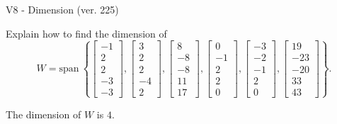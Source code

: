 \begin{exercise}
  \begin{exerciseTitle}V8 - Dimension (ver. 225)\end{exerciseTitle}
  \begin{exerciseStatement}
    Explain how to find the dimension of 
\[W=\mathrm{span}\ \left\{\left[\begin{array}{r}
-1 \\
2 \\
2 \\
-3 \\
-3
\end{array}\right] , \left[\begin{array}{r}
3 \\
2 \\
2 \\
-4 \\
2
\end{array}\right] , \left[\begin{array}{r}
8 \\
-8 \\
-8 \\
11 \\
17
\end{array}\right] , \left[\begin{array}{r}
0 \\
-1 \\
2 \\
2 \\
0
\end{array}\right] , \left[\begin{array}{r}
-3 \\
-2 \\
-1 \\
2 \\
0
\end{array}\right] , \left[\begin{array}{r}
19 \\
-23 \\
-20 \\
33 \\
43
\end{array}\right]\right\}.\]



  \end{exerciseStatement}
  \begin{exerciseAnswer}
   The dimension of \(W\) is  \(4\).
  


  \end{exerciseAnswer}
\end{exercise}